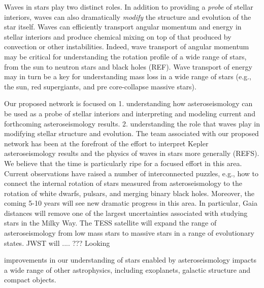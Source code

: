 Waves in stars play two distinct roles.  In addition to providing a {\em probe} of stellar interiors, waves can also dramatically {\em modify} the structure and evolution of the star itself.   Waves can efficiently transport angular momentum and energy in stellar interiors and produce chemical mixing on top of that produced by convection or other instabilities.   Indeed, wave transport of angular momentum may be critical for understanding the rotation profile of a wide range of stars, from the sun to neutron stars and black holes (REF).   Wave transport of energy may in turn be a key for understanding mass loss in a wide range of stars (e.g., the sun, red supergiants, and pre core-collapse massive stars).   

Our proposed network is focused on 1.  understanding how asteroseismology can be used as a probe of stellar interiors and interpreting and modeling current and forthcoming asteroseismology results.  2.  understanding the role that waves play in modifying stellar structure and evolution.  The team associated with our proposed network has been at the forefront of the effort to interpret Kepler asteroseismology results and the physics of waves in stars more generally (REFS).  We believe that the time is particularly ripe for a focused effort in this area.  Current observations have raised a number of interconnected puzzles, e.g., how to connect the internal rotation of stars measured from asteroseismology to the rotation of white dwarfs, pulsars, and merging binary black holes.   Moreover, the coming 5-10 years will see new dramatic progress in this area. In particular, Gaia distances will remove one of the largest uncertainties associated with studying stars in the Milky Way.  The TESS satellite will expand the range of asteroseismology from low mass stars to massive stars in a range of evolutionary states.   JWST will .... ???    Looking



improvements in our understanding of stars enabled by asteroseismology impacts a wide range of other astrophysics, including exoplanets, galactic structure and compact objects.   


